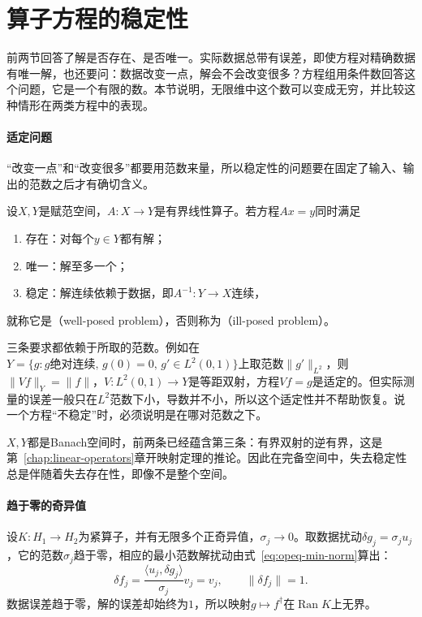 \section{算子方程的稳定性}
\label{sec:opeq-stability}

前两节回答了解是否存在、是否唯一。实际数据总带有误差，即使方程对精确数据有唯一解，也还要问：数据改变一点，解会不会改变很多？方程组用条件数回答这个问题，它是一个有限的数。本节说明，无限维中这个数可以变成无穷，并比较这种情形在两类方程中的表现。

\paragraph{适定问题}
“改变一点”和“改变很多”都要用范数来量，所以稳定性的问题要在固定了输入、输出的范数之后才有确切含义。

\begin{definition}[适定问题与不适定问题]
\label{def:opeq-well-posed}
设$X,Y$是赋范空间，$A:X\to Y$是有界线性算子。若方程$Ax=y$同时满足
\begin{enumerate}
  \item 存在：对每个$y\in Y$都有解；
  \item 唯一：解至多一个；
  \item 稳定：解连续依赖于数据，即$A^{-1}:Y\to X$连续，
\end{enumerate}
就称它是（well-posed problem），否则称为（ill-posed problem）。
\end{definition}

三条要求都依赖于所取的范数。例如在$Y=\{g:g\text{绝对连续},\,g(0)=0,\,g'\in L^2(0,1)\}$上取范数$\lVert g'\rVert_{L^2}$，则$\lVert Vf\rVert_Y=\lVert f\rVert$，$V:L^2(0,1)\to Y$是等距双射，方程$Vf=g$是适定的。但实际测量的误差一般只在$L^2$范数下小，导数并不小，所以这个适定性并不帮助恢复。说一个方程“不稳定”时，必须说明是在哪对范数之下。

$X,Y$都是Banach空间时，前两条已经蕴含第三条：有界双射的逆有界，这是第~\ref{chap:linear-operators}章开映射定理的推论。因此在完备空间中，失去稳定性总是伴随着失去存在性，即像不是整个空间。

\paragraph{趋于零的奇异值}
设$K:H_1\to H_2$为紧算子，并有无限多个正奇异值，$\sigma_j\to0$。取数据扰动$\delta g_j=\sigma_ju_j$，它的范数$\sigma_j$趋于零，相应的最小范数解扰动由式~\eqref{eq:opeq-min-norm}算出：
\[
  \delta f_j=\frac{\langle u_j,\delta g_j\rangle}{\sigma_j}v_j=v_j,\qquad\lVert\delta f_j\rVert=1.
\]
数据误差趋于零，解的误差却始终为$1$，所以映射$g\mapsto f^\dagger$在$\operatorname{Ran}K$上无界。

